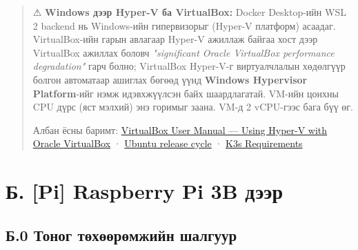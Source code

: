 \begin{quote}
⚠ \textbf{Windows дээр Hyper-V ба VirtualBox:} Docker Desktop-ийн WSL 2 backend нь Windows-ийн гипервизорыг (Hyper-V платформ) асаадаг. VirtualBox-ийн гарын авлагаар Hyper-V ажиллаж байгаа хост дээр VirtualBox ажиллах боловч \emph{"significant Oracle VirtualBox performance degradation"} гарч болно; VirtualBox Hyper-V-г виртуалчлалын хөдөлгүүр болгон автоматаар ашиглах бөгөөд үүнд \textbf{Windows Hypervisor Platform}-ийг нэмж идэвхжүүлсэн байх шаардлагатай. VM-ийн цонхны CPU дүрс (яст мэлхий) энэ горимыг заана. VM-д 2 vCPU-гээс бага бүү өг.

Албан ёсны баримт: \href{https://www.virtualbox.org/manual/UserManual.html}{VirtualBox User Manual --- Using Hyper-V with Oracle VirtualBox} · \href{https://ubuntu.com/about/release-cycle}{Ubuntu release cycle} · \href{https://docs.k3s.io/installation/requirements}{K3s Requirements}
\end{quote}

\hypertarget{ux431.-pi-raspberry-pi-3b-ux434ux44dux44dux440}{%
\section{Б. {[}Pi{]} Raspberry Pi 3B дээр}\label{ux431.-pi-raspberry-pi-3b-ux434ux44dux44dux440}}

\hypertarget{ux431.0-ux442ux43eux43dux43eux433-ux442ux4e9ux445ux4e9ux4e9ux440ux4e9ux43cux436ux438ux439ux43d-ux448ux430ux43bux433ux443ux443ux440}{%
\subsection{Б.0 Тоног төхөөрөмжийн шалгуур}\label{ux431.0-ux442ux43eux43dux43eux433-ux442ux4e9ux445ux4e9ux4e9ux440ux4e9ux43cux436ux438ux439ux43d-ux448ux430ux43bux433ux443ux443ux440}}


